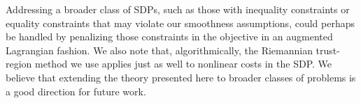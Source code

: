 \documentclass{article}
\newcommand{\1}{\mathbf{1}}
\begin{document}
Addressing a broader class of SDPs, such as those with inequality constraints or equality constraints that may violate our smoothness assumptions, could perhaps be handled by penalizing those constraints in the objective in an augmented Lagrangian fashion. We also note that, algorithmically, the Riemannian trust-region method we use applies just as well to nonlinear costs in the SDP.
We believe that extending the theory presented here to broader classes of problems is a good direction for future work.

\end{document}
